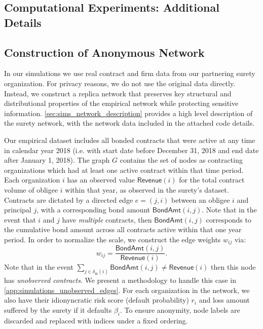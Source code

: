 \documentclass[mnsc,nonblindrev]{informs3}
\newcommand{\din}{\delta_{\text{in}}}
\newcommand{\revenue}{\textsf{Revenue}}
\newcommand{\bond}{\textsf{BondAmt}}
\begin{document}
\begin{APPENDICES}
\section{Computational Experiments: Additional Details}
\label{sec:app_simulations}

\subsection{Construction of Anonymous Network}
\label{app:simulations_network_construction}

In our simulations we use real contract and firm data from our partnering surety organization.  For privacy reasons, we do not use the original data directly. Instead, we construct a replica network that preserves key structural and distributional properties of the empirical network while protecting sensitive information.  \cref{sec:sims_network_description} provides a high level description of the surety network, with the network data included in the attached code details.

Our empirical dataset includes all bonded contracts that were active at any time in calendar year 2018 (i.e. with start date before December 31, 2018 and end date after January 1, 2018).  The graph $G$ contains the set of nodes as contracting organizations which had at least one active contract within that time period.  Each organization $i$ has an observed value $\revenue(i)$ for the total contract volume of obligee $i$ within that year, as observed in the surety’s dataset.  Contracts are dictated by a directed edge $e = (j, i)$ between an obligee $i$ and principal $j$, with a corresponding bond amount $\bond(i,j)$.  Note that in the event that $i$ and $j$ have {\em multiple} contracts, then $\bond(i,j)$ corresponds to the cumulative bond amount across all contracts active within that one year period.  In order to normalize the scale, we construct the edge weights $w_{ij}$ via:
\[
w_{ij} = \frac{\bond(i,j)}{\revenue(i)}.
\]
Note that in the event $\sum_{j \in \din(i)} \bond(i,j) \neq \revenue(i)$ then this node has {\em unobserved contracts}. We present a methodology to handle this case in \cref{app:simulations_unobserved_edges}.  For each organization in the network, we also have their idionyncratic risk score (default probability) $r_i$ and loss amount suffered by the surety if it defaults $\beta_i$. To ensure anonymity, node labels are discarded and replaced with indices under a fixed ordering.


\end{APPENDICES}
\end{document}
